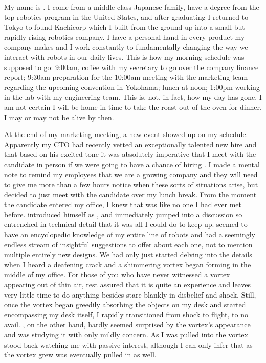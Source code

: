 \documentclass[char]{guardians}
\begin{document}
\name{\cKachiko{}}

My name is \cKachiko{\intro}. I come from a middle-class Japanese family, have a degree from the top robotics program in the United States, and after graduating I returned to Tokyo to found Kachicorp which I built from the ground up into a small but rapidly rising robotics company. I have a personal hand in every product my company makes and I work constantly to fundamentally changing the way we interact with robots in our daily lives. This is how my morning schedule was supposed to go: 9:00am, coffee with my secretary to go over the company finance report; 9:30am preparation for the 10:00am meeting with the marketing team regarding the upcoming convention in Yokohama; lunch at noon; 1:00pm working in the lab with my engineering team. This is, not, in fact, how my day has gone. I am not certain I will be home in time to take the roast out of the oven for dinner. I may or may not be alive by then.

At the end of my marketing meeting, a new event showed up on my schedule. Apparently my CTO had recently vetted an exceptionally talented new hire and that based on his excited tone it was absolutely imperative that I meet with the candidate in person if we were going to have a chance of hiring \cUnity{\them}. I made a mental note to remind my employees that we are a growing company and they will need to give me more than a few hours notice when these sorts of situations arise, but decided to just meet with the candidate over my lunch break. From the moment the candidate entered my office, I knew that \cUnity{\they} was like no one I had ever met before. \cUnity{\They} introduced himself as \cUnity{\intro}, and immediately jumped into a discussion so entrenched in technical detail that it was all I could do to keep up. \cUnity{} seemed to have an encyclopedic knowledge of my entire line of robots and had a seemingly endless stream of insightful suggestions to offer about each one, not to mention multiple entirely new designs. We had only just started delving into the details when I heard a deafening crack and a shimmering vortex began forming in the middle of my office. For those of you who have never witnessed a vortex appearing out of thin air, rest assured that it is quite an experience and leaves very little time to do anything besides stare blankly in disbelief and shock. Still, once the vortex began greedily absorbing the objects on my desk and started encompassing my desk itself, I rapidly transitioned from shock to flight, to no avail. \cUnity{}, on the other hand, hardly seemed surprised by the vortex's appearance and was studying it with only mildly concern. As I was pulled into the vortex \cUnity{\they} stood back watching me with passive interest, although I can only infer that as the vortex grew \cUnity{\they} was eventually pulled in as well.
\end{document}
